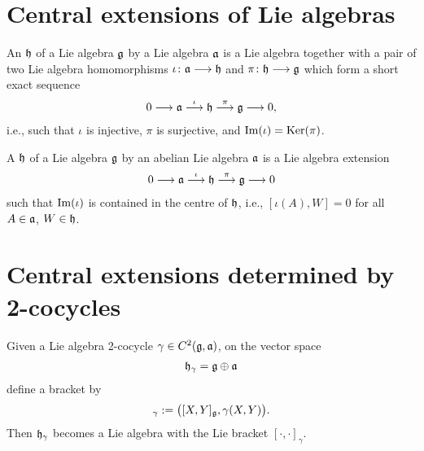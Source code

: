 \section{Central extensions of Lie algebras}

\begin{definition}
  \label{def:LieExtension}
  \leanok
  An  $\mathfrak{h}$ of a Lie algebra $\mathfrak{g}$ by a Lie algebra $\mathfrak{a}$ is
  a Lie algebra together with a pair of two Lie algebra homomorphisms
  $\iota \colon \mathfrak{a} \longrightarrow \mathfrak{h}$ and
  $\pi \colon \mathfrak{h} \longrightarrow \mathfrak{g}$ which form a
  short exact sequence
  \begin{align*}
    0 \longrightarrow \mathfrak{a}
      \overset{\iota}{\longrightarrow} \mathfrak{h}
      \overset{\pi}{\longrightarrow} \mathfrak{g}
      \longrightarrow 0 ,
  \end{align*}
  i.e., such that $\iota$ is injective, $\pi$ is surjective,
  and $\mathrm{Im} (\iota) = \mathrm{Ker} (\pi)$.
\end{definition}

\begin{definition}
  \label{def:LieCentralExtension}
  \leanok
  A  $\mathfrak{h}$ of a Lie algebra $\mathfrak{g}$ by an abelian Lie algebra $\mathfrak{a}$ is
  a Lie algebra extension
  \begin{align*}
    0 \longrightarrow \mathfrak{a}
      \overset{\iota}{\longrightarrow} \mathfrak{h}
      \overset{\pi}{\longrightarrow} \mathfrak{g}
      \longrightarrow 0
  \end{align*}
  such that $\mathrm{Im} (\iota)$ is contained in the centre of $\mathfrak{h}$,
  i.e., $[\iota(A), W] = 0$ for all $A \in \mathfrak{a}$, $W \in \mathfrak{h}$.
\end{definition}



\section{Central extensions determined by 2-cocycles}

\begin{definition}
  \label{def:CentralExtensionOfCocycle}
  \leanok
  Given a Lie algebra 2-cocycle $\gamma \in C^2(\mathfrak{g},\mathfrak{a})$,
  on the vector space
  \begin{align*}
    \mathfrak{h}_\gamma = \mathfrak{g} \oplus \mathfrak{a}
  \end{align*}
  define a bracket by
  \begin{align*}
    [(X, A), (Y, B)]_{\gamma} := \big([X, Y]_{\gLie}, \gamma(X, Y) \big) .
  \end{align*}
  Then $\mathfrak{h}_\gamma$ becomes a Lie algebra with the Lie bracket
  $[\cdot,\cdot]_{\gamma}$.
\end{definition}

